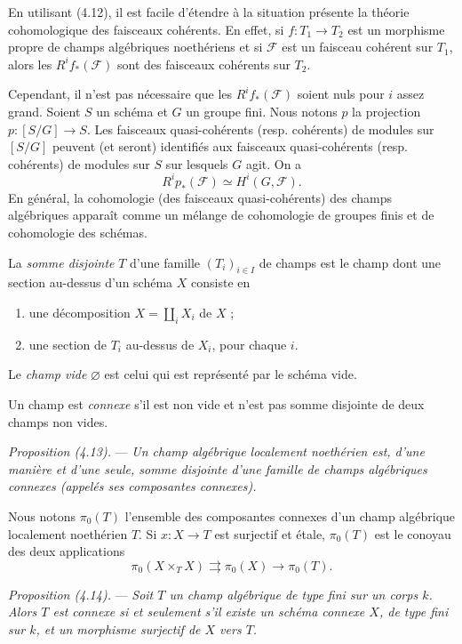 \documentclass[10pt]{article}
\begin{document}
En utilisant (4.12), il est facile d'étendre à la situation présente la théorie cohomologique des faisceaux cohérents. En effet, si $f:T_1\to T_2$ est un morphisme propre de champs algébriques noethériens et si $\mathscr F$ est un faisceau cohérent sur $T_1$, alors les $R^if_*(\mathscr F)$ sont des faisceaux cohérents sur $T_2$.

Cependant, il n'est pas nécessaire que les $R^if_*(\mathscr F)$ soient nuls pour $i$ assez grand. Soient $S$ un schéma et $G$ un groupe fini. Nous notons $p$ la projection $p:[S/G]\to S$. Les faisceaux quasi-cohérents (resp. cohérents) de modules sur $[S/G]$ peuvent (et seront) identifiés aux faisceaux quasi-cohérents (resp. cohérents) de modules sur $S$ sur lesquels $G$ agit. On a
\[
R^i p_*(\mathscr F)\simeq H^i(G,\mathscr F).
\]
En général, la cohomologie (des faisceaux quasi-cohérents) des champs algébriques apparaît comme un mélange de cohomologie de groupes finis et de cohomologie des schémas.

La \emph{somme disjointe} $T$ d'une famille $(T_i)_{i\in I}$ de champs est le champ dont une section au-dessus d'un schéma $X$ consiste en
\begin{enumerate}[label=(\roman*)]
\item une décomposition $X=\coprod_i X_i$ de $X$ ;
\item une section de $T_i$ au-dessus de $X_i$, pour chaque $i$.
\end{enumerate}

Le \emph{champ vide} $\varnothing$ est celui qui est représenté par le schéma vide.

Un champ est \emph{connexe} s'il est non vide et n'est pas somme disjointe de deux champs non vides.

\medskip
\noindent\emph{Proposition (4.13).} --- \emph{Un champ algébrique localement noethérien est, d'une manière et d'une seule, somme disjointe d'une famille de champs algébriques connexes (appelés ses composantes connexes).}

Nous notons $\pi_0(T)$ l'ensemble des composantes connexes d'un champ algébrique localement noethérien $T$. Si $x:X\to T$ est surjectif et étale, $\pi_0(T)$ est le conoyau des deux applications
\[
\pi_0(X\times_T X)\rightrightarrows \pi_0(X)\longrightarrow \pi_0(T).
\]

\medskip
\noindent\emph{Proposition (4.14).} --- \emph{Soit $T$ un champ algébrique de type fini sur un corps $k$. Alors $T$ est connexe si et seulement s'il existe un schéma connexe $X$, de type fini sur $k$, et un morphisme surjectif de $X$ vers $T$.}
\end{document}
